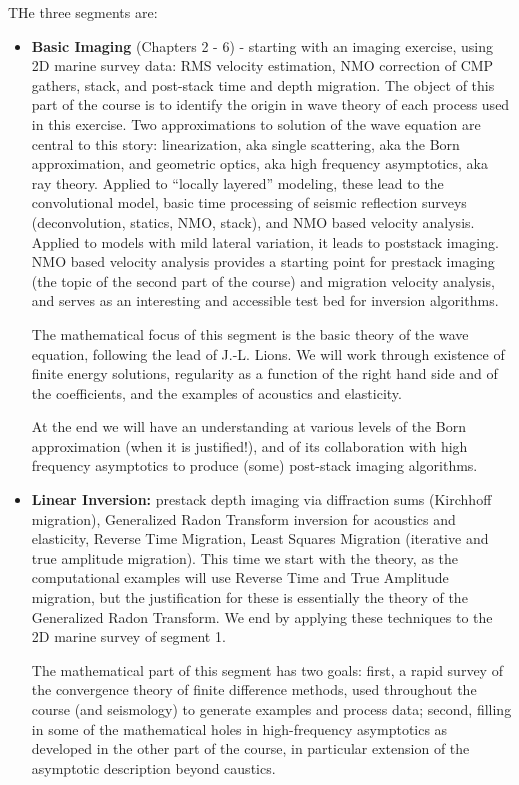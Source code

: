 THe three segments are:

\begin{itemize}
\item {\bf Basic Imaging} (Chapters 2 - 6) - starting with an imaging exercise, using 2D marine survey data: RMS velocity estimation, NMO correction of CMP gathers, stack, and post-stack time and depth migration. The object of this part of the course is to identify the origin in wave theory of each process used in this exercise. Two approximations to solution of the wave equation are central to this story: linearization, aka single scattering, aka the Born approximation, and geometric optics, aka high frequency asymptotics, aka ray theory. Applied to ``locally layered'' modeling, these lead to the convolutional model, basic time processing of seismic reflection surveys (deconvolution, statics, NMO, stack), and NMO based velocity analysis. Applied to models with mild lateral variation, it leads to poststack imaging. NMO based velocity analysis provides a starting point for prestack imaging (the topic of the second part of the course) and migration velocity analysis, and serves as an interesting and accessible test bed for inversion algorithms.  

The mathematical focus of this segment is the basic theory of the wave equation, following the lead of J.-L. Lions. We will work through existence of finite energy solutions, regularity as a function of the right hand side and of the coefficients, and the examples of acoustics and elasticity.

At the end we will have an understanding at various levels of the Born approximation (when it is justified!), and of its collaboration with high frequency asymptotics to produce (some) post-stack imaging algorithms.

\item {\bf Linear Inversion:} prestack depth imaging via diffraction sums (Kirchhoff migration), Generalized Radon Transform inversion for acoustics and elasticity, Reverse Time Migration, Least Squares Migration (iterative and true amplitude migration). This time we start with the theory, as the computational examples will use Reverse Time and True Amplitude migration, but the justification for these is essentially the theory of the Generalized Radon Transform. We end by applying these techniques to the 2D marine survey of segment 1.

The mathematical part of this segment has two goals: first, a rapid survey of the convergence theory of finite difference methods, used throughout the course (and seismology) to generate examples and process data; second, filling in some of the mathematical holes in high-frequency asymptotics as developed in the other part of the course, in particular extension of the asymptotic description beyond caustics. 


\end{itemize}
